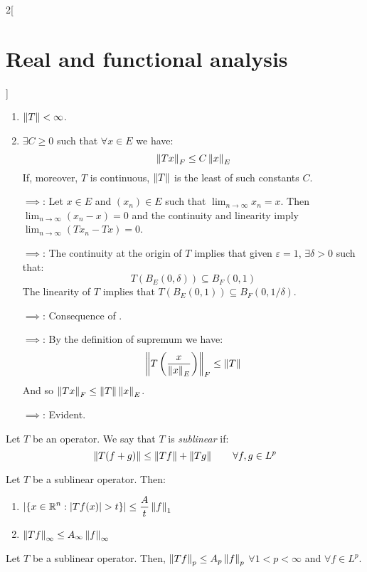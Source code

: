 \documentclass[../../../main_math.tex]{subfiles}
\begin{document}
\begin{multicols}{2}[\section{Real and functional analysis}]
\begin{theorem}
\begin{enumerate}[ref = \arabic{enumi}]
      \item\label{RFA:TcontinuousD} $\left\|T\right\|<\infty$.
      \item\label{RFA:TcontinuousE} $\exists C\geq 0$ such that $\forall x\in E$ we have: $$\left\|Tx\right\|_F\leq C\left\|x\right\|_E$$
      If, moreover, $T$ is continuous, $\left\|T\right\|$ is the least of such constants $C$.
    \end{enumerate}
  \end{theorem}
  \begin{sproof}
    \begin{enumerate}[leftmargin=1.5cm]
      \item[\mref{RFA:TcontinuousA}$\implies$\mref{RFA:TcontinuousB}:] Let $x\in E$ and $(x_n)\in E$ such that $\displaystyle \lim_{n\to\infty}x_n=x$. Then $\displaystyle \lim_{n\to\infty}(x_n - x)=0$ and the continuity and linearity imply $\displaystyle \lim  _{n\to\infty}(Tx_n-Tx)=0$.
      \item[\mref{RFA:TcontinuousB}$\implies$\mref{RFA:TcontinuousC}:] The continuity at the origin of $T$ implies that given $\varepsilon =1$, $\exists \delta>0$ such that: $$T(B_E(0,\delta))\subseteq B_F(0,1)$$
        The linearity of $T$ implies that $T(B_E(0,1))\subseteq B_F(0,1/\delta)$.
      \item[\mref{RFA:TcontinuousC}$\implies$\mref{RFA:TcontinuousD}:] Consequence of .
      \item[\mref{RFA:TcontinuousD}$\implies$\mref{RFA:TcontinuousE}:] By the definition of supremum we have: $$\left\|T\left(\frac{x}{\left\|x\right\|_E}\right)\right\|_F\leq \left\|T\right\|$$ And so $\left\|Tx\right\|_F\leq \left\|T\right\|\left\|x\right\|_E$.
      \item[\mref{RFA:TcontinuousE}$\implies$\mref{RFA:TcontinuousA}:] Evident.
    \end{enumerate}
  \end{sproof}
  \begin{definition}
    Let $T$ be an operator. We say that $T$ is \emph{sublinear} if: $$\left\|T(f+g)\right\|\leq \left\|Tf\right\|+\left\|Tg\right\|\qquad\forall f,g\in L^p$$
  \end{definition}
  \begin{theorem}
    Let $T$ be a sublinear operator. Then:
    \begin{enumerate}
      \item $\displaystyle\m{\{x\in\RR^n:\abs{Tf(x)}>t\}}\leq \frac{A}{t}\norm{f}_1$
      \item $\left\|Tf\right\|_\infty\leq A_\infty\left\|f\right\|_\infty$
    \end{enumerate}
  \end{theorem}
  \begin{corollary}
    Let $T$ be a sublinear operator. Then, $\left\|Tf\right\|_p\leq A_p\left\|f\right\|_p$ $\forall 1<p<\infty$ and $\forall f\in L^p$.
  \end{corollary}

\end{multicols}
\end{document}
